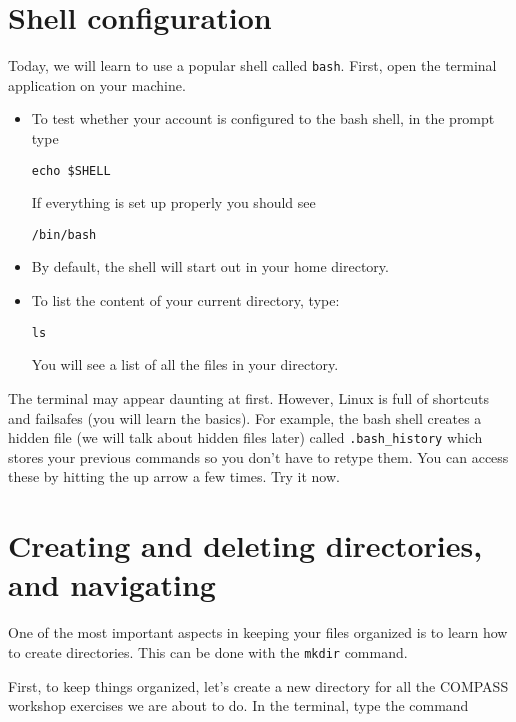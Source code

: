 \documentclass[aps,showpacs,prd,notitlepage,preprintnumbers,amsmath,amssymb,letterpaper]{revtex4}
\begin{document}
\section{Shell configuration}
Today, we will learn to use a popular shell called \verb|bash|.
First, open the terminal application on your machine.

\begin{itemize}[leftmargin=*,itemsep=0.05em]
\item To test whether your account is configured to the bash shell, in the
prompt type

\begin{verbatim}
echo $SHELL
\end{verbatim}

If everything is set up properly you should see

\begin{verbatim}
/bin/bash
\end{verbatim}

  \item By default, the shell will start out in your home directory.
  \item To list the content of your current directory, type:

\begin{verbatim}
ls
\end{verbatim}
  
You will see a list of all the files in your directory.

\end{itemize}

The terminal may appear daunting at first. However, Linux is full of
shortcuts and failsafes (you will learn the basics). For example, the
bash shell creates a hidden file (we will talk about hidden files
later) called \verb|.bash_history| which stores
  your previous commands so you don't have to retype them. You can
  access these by hitting the up arrow a few times. Try it now.

\section{Creating and deleting directories, and navigating}

One of the most important aspects in keeping your files organized is to learn how to create directories. This can be done with the \verb|mkdir| command.

First, to keep things organized, let's create a new directory for all the COMPASS workshop exercises we are about to do.
In the terminal, type the command
\end{document}
